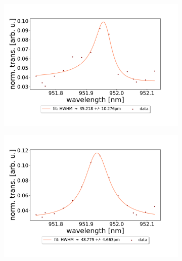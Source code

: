 \begin{figure}[h!] \ContinuedFloat
    \centering
    \begin{subfigure}[b]{0.49\textwidth}
        \includegraphics[width=\textwidth]{figures/results/double fano fits/20250326/53um_M3:M5_fit_7.pdf}
        \caption{}
        \label{fig:53um_M3:M5_fit_7}
    \end{subfigure}
    \begin{subfigure}[b]{0.49\textwidth}
        \includegraphics[width=\textwidth]{figures/results/double fano fits/20250326/53um_M3:M5_fit_8.pdf}
        \caption{}
        \label{fig:53um_M3:M5_fit_8}
    \end{subfigure}
    \begin{subfigure}[b]{0.49\textwidth}

\end{subfigure}
\end{figure}
